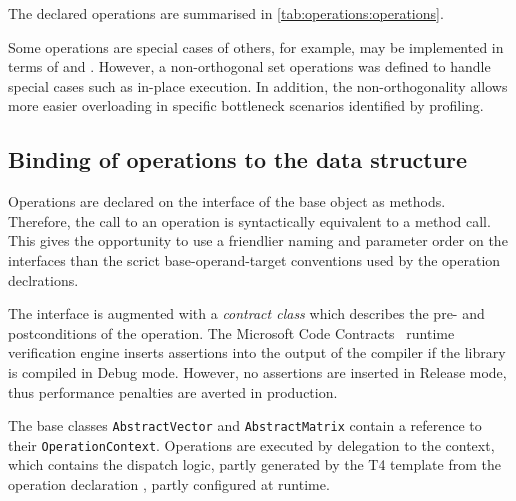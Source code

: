 The declared operations are summarised in
\cref{tab:operations:operations}.

Some operations are special cases of others, for example,
 may be implemented in terms of
 and
. However, a
non-orthogonal set operations was defined to handle special cases such
as in-place execution. In addition, the non-orthogonality allows
more easier overloading in specific bottleneck scenarios identified by
profiling.

\subsection{Binding of operations to the data structure}

Operations are declared on the interface of the base object as
methods. Therefore, the call to an operation is syntactically
equivalent to a method call. This gives the opportunity to use a
friendlier naming and parameter order on the interfaces than the
scrict base-operand-target conventions used by the operation
declrations.

The interface is augmented with a \emph{contract class} which
describes the pre- and postconditions of the operation. The Microsoft
Code Contracts~\citep{CodeContracts} runtime verification engine
inserts assertions into the output of the compiler if the library is
compiled in Debug mode. However, no assertions are inserted in Release
mode, thus performance penalties are averted in production.

The base classes \texttt{AbstractVector} and \texttt{AbstractMatrix}
contain a reference to their \texttt{OperationContext}. Operations are
executed by delegation to the context, which contains the dispatch
logic, partly generated by the T4 template from the operation
declaration , partly configured at runtime.


